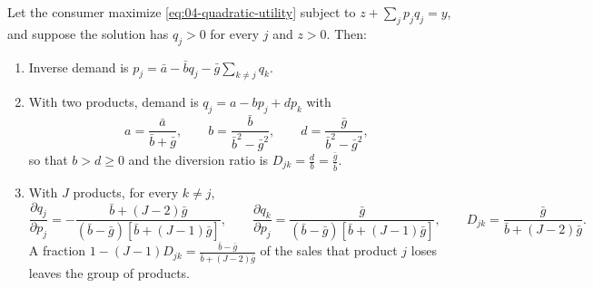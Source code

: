\begin{proposition}\label{prop:04-quadratic}
Let the consumer maximize \eqref{eq:04-quadratic-utility} subject to $z + \sum_j p_jq_j = y$, and suppose the
solution has $q_j > 0$ for every $j$ and $z > 0$. Then:
\begin{enumerate}[label=(\roman*)]
\item Inverse demand is $p_j = \bar a - \bar bq_j - \bar g\sum_{k \ne j}q_k$.
\item With two products, demand is $q_j = a - bp_j + dp_k$ with
\begin{equation*}
a = \frac{\bar a}{\bar b + \bar g}, \qquad b = \frac{\bar b}{\bar b^2 - \bar g^2}, \qquad d = \frac{\bar g}{\bar b^2 - \bar g^2},
\end{equation*}
so that $b > d \ge 0$ and the diversion ratio is $D_{jk} = \frac{d}{b} = \frac{\bar g}{\bar b}$.
\item With $J$ products, for every $k \ne j$,
\begin{equation*}
\frac{\partial q_j}{\partial p_j} = -\frac{\bar b + (J-2)\bar g}{(\bar b - \bar g)[\bar b + (J-1)\bar g]},
\qquad
\frac{\partial q_k}{\partial p_j} = \frac{\bar g}{(\bar b - \bar g)[\bar b + (J-1)\bar g]},
\qquad
D_{jk} = \frac{\bar g}{\bar b + (J-2)\bar g}.
\end{equation*}
A fraction $1 - (J-1)D_{jk} = \frac{\bar b - \bar g}{\bar b + (J-2)\bar g}$ of the sales that product $j$ loses
leaves the group of products.
\end{enumerate}
\end{proposition}

